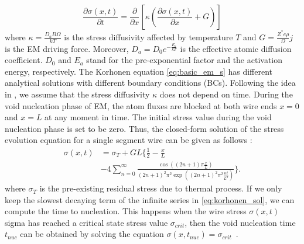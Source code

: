 %
\begin{equation}
\label{eq:basic_em_s}
\frac{\partial \sigma(x,t)}{\partial t}=\frac{\partial }{\partial x}\left[\kappa\left(\frac{\partial \sigma(x,t)}{\partial x}+G\right)\right]
\end{equation}
where $\kappa=\frac{D_aB\Omega}{kT}$ is the stress diffusivity
affected by temperature $T$ and $G=\frac{Z^*e\rho}{\Omega}j$ is the EM
driving force. Moreover, $D_a=D_0e^{-\frac{E_a}{kT}}$ is the effective
atomic diffusion coefficient. $D_0$ and $E_a$ stand for the
pre-exponential factor and the activation energy, respectively. The
Korhonen equation \eqref{eq:basic_em_s} has different analytical
solutions with different boundary conditions (BCs). Following the idea
in \cite{Korhonen:jap1993}, we assume that the stress diffusivity
$\kappa$ does not depend on time. During the void nucleation phase of
EM, the atom fluxes are blocked at both wire ends $x=0$ and $x=L$ at
any moment in time. The initial stress value during the void
nucleation phase is set to be zero. Thus, the closed-form solution of
the stress evolution equation for a single segment wire can be given
as follows \cite{Korhonen:jap1993}:
\begin{equation} \label{eq:korhonen_sol}
\begin{split}
\sigma(x,t)&= \sigma_T+ GL\{\frac{1}{2}-\frac{x}{L}\\
&-4\sum\limits_{n=0}^{\infty}\frac{\cos((2n+1)\pi
\frac{x}{L})}{(2n+1)^2\pi^2\exp((2n+1)^2\pi^2\frac{\kappa
t}{L^2})}\}.
\end{split}
\end{equation}
where $\sigma_T$ is the pre-existing residual stress due to thermal
process. If we only keep the slowest decaying term of the infinite
series in \eqref{eq:korhonen_sol}, we can compute the time to
nucleation. This happens when the wire stress $\sigma(x,t)$ sigma has
reached a critical state stress value $\sigma_{crit}$, then the void
nucleation time $t_{nuc}$ can be obtained by solving the equation
$\sigma(x,t_{nuc})=\sigma_{crit}$~\cite{HuangYu:DAC'14}.

